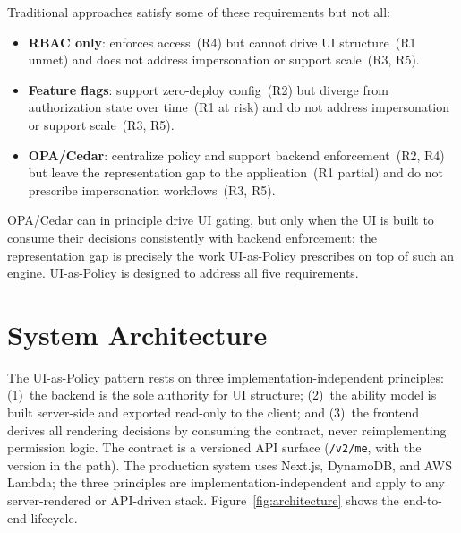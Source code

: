 \documentclass[10pt,journal]{IEEEtran}
\newcommand{\uiPolicy}{UI-as-Policy}
\newcommand{\code}[1]{{\small\textcolor{CausifyBlue}{\texttt{#1}}}}
\begin{document}
Traditional approaches satisfy some of these requirements but not all:
\begin{itemize}[label=\textbullet, leftmargin=1.2em, topsep=2pt, itemsep=1pt, parsep=0pt, partopsep=0pt]
  \item \textbf{RBAC only}: enforces access~(R4) but cannot drive UI
    structure~(R1 unmet) and does not address impersonation or support
    scale~(R3, R5).
  \item \textbf{Feature flags}: support zero-deploy config~(R2) but diverge
    from authorization state over time~(R1 at risk) and do not address
    impersonation or support scale~(R3, R5).
  \item \textbf{OPA/Cedar}: centralize policy and support backend
    enforcement~(R2, R4) but leave the representation gap to the
    application~(R1 partial) and do not prescribe impersonation
    workflows~(R3, R5).
\end{itemize}

OPA/Cedar can in principle drive UI gating, but only when the UI is built
to consume their decisions consistently with backend enforcement; the
representation gap is precisely the work \uiPolicy{} prescribes on top of
such an engine. \uiPolicy{} is designed to address all five requirements.

\section{System Architecture}

The \uiPolicy{} pattern rests on three implementation-independent
principles: (1)~the backend is the sole authority for UI structure;
(2)~the ability model is built server-side and exported read-only to the
client; and (3)~the frontend derives all rendering decisions by consuming
the contract, never reimplementing permission logic. The contract is a versioned API surface (\code{/v2/me}, with the version
in the path). The production system uses Next.js, DynamoDB, and AWS Lambda;
the three principles are implementation-independent and apply to any
server-rendered or API-driven stack. Figure~\ref{fig:architecture} shows the end-to-end lifecycle.
\end{document}
